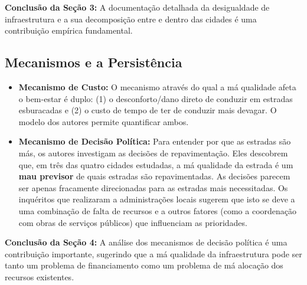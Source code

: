 \documentclass[12pt, a4paper]{article}
\begin{document}
\noindent\textbf{Conclusão da Seção 3:} A documentação detalhada da desigualdade de infraestrutura e a sua decomposição entre e dentro das cidades é uma contribuição empírica fundamental.

\subsection{Mecanismos e a Persistência}

\begin{itemize}
    \item \textbf{Mecanismo de Custo:} O mecanismo através do qual a má qualidade afeta o bem-estar é duplo: (1) o desconforto/dano direto de conduzir em estradas esburacadas e (2) o custo de tempo de ter de conduzir mais devagar. O modelo dos autores permite quantificar ambos.
    \item \textbf{Mecanismo de Decisão Política:} Para entender por que as estradas são más, os autores investigam as decisões de repavimentação. Eles descobrem que, em três das quatro cidades estudadas, a má qualidade da estrada é um \textbf{mau previsor} de quais estradas são repavimentadas. As decisões parecem ser apenas fracamente direcionadas para as estradas mais necessitadas. Os inquéritos que realizaram a administrações locais sugerem que isto se deve a uma combinação de falta de recursos e a outros fatores (como a coordenação com obras de serviços públicos) que influenciam as prioridades.
\end{itemize}

\noindent\textbf{Conclusão da Seção 4:} A análise dos mecanismos de decisão política é uma contribuição importante, sugerindo que a má qualidade da infraestrutura pode ser tanto um problema de financiamento como um problema de má alocação dos recursos existentes.
\end{document}

